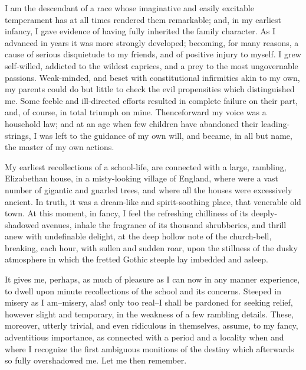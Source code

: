 \documentclass[12pt]{book}
\begin{document}
     I am the descendant of a race whose imaginative and easily
excitable temperament has at all times rendered them remarkable;
and, in my earliest infancy, I gave evidence of having fully
inherited the family character.  As I advanced in years it was more
strongly developed; becoming, for many reasons, a cause of serious
disquietude to my friends, and of positive injury to myself.  I
grew self-willed, addicted to the wildest caprices, and a prey to
the most ungovernable passions.  Weak-minded, and beset with
constitutional infirmities akin to my own, my parents could do but
little to check the evil propensities which distinguished me.  Some
feeble and ill-directed efforts resulted in complete failure on
their part, and, of course, in total triumph on mine. 
Thenceforward my voice was a household law; and at an age when few
children have abandoned their leading-strings, I was left to the
guidance of my own will, and became, in all but name, the master of
my own actions.

     My earliest recollections of a school-life, are connected with
a large, rambling, Elizabethan house, in a misty-looking village of
England, where were a vast number of gigantic and gnarled trees,
and where all the houses were excessively ancient.  In truth, it
was a dream-like and spirit-soothing place, that venerable old
town.  At this moment, in fancy, I feel the refreshing chilliness
of its deeply-shadowed avenues, inhale the fragrance of its
thousand shrubberies, and thrill anew with undefinable delight, at
the deep hollow note of the church-bell, breaking, each hour, with
sullen and sudden roar, upon the stillness of the dusky atmosphere
in which the fretted Gothic steeple lay imbedded and asleep.

     It gives me, perhaps, as much of pleasure as I can now in any
manner experience, to dwell upon minute recollections of the school
and its concerns.  Steeped in misery as I am--misery, alas! only
too real--I shall be pardoned for seeking relief, however slight
and temporary, in the weakness of a few rambling details.  These,
moreover, utterly trivial, and even ridiculous in themselves,
assume, to my fancy, adventitious importance, as connected with a
period and a locality when and where I recognize the first
ambiguous monitions of the destiny which afterwards so fully
overshadowed me.  Let me then remember.
\end{document}
